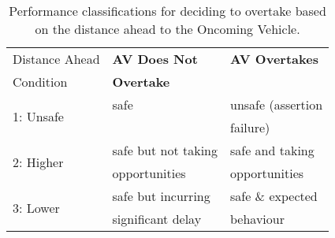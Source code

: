 \begin{table}[]
\centering
\begin{tabular}{|p{2.3cm}|p{2.3cm}|p{2.3cm}|}
\hline
\multicolumn{1}{|l|}{Distance Ahead} & \multicolumn{1}{l|}{\textbf{AV Does Not }} & \multicolumn{1}{l|}{\textbf{AV Overtakes}} \\ 
Condition & \textbf{Overtake} & \\
\hline
\multirow{2}{*}{1: Unsafe} & safe & unsafe (assertion \\
& & failure) \\
\hline
\multirow{2}{*}{2: Higher} & safe but not taking & safe and taking\\ 
      Performance & opportunities & opportunities\\
\hline
\multirow{2}{*}{3: Lower} & safe but incurring  & safe \& expected  \\ 
Performance & significant delay & behaviour\\
\hline
\end{tabular}
\caption{Performance classifications for deciding to overtake based on the distance ahead to the Oncoming Vehicle.}
\label{performance_metric_table}
\end{table}



